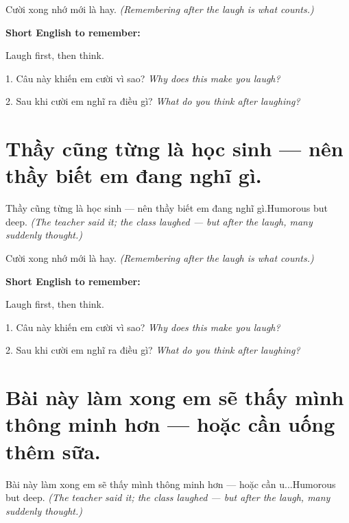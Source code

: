 \begin{baihoc}
Cười xong nhớ mới là hay.
\textit{(Remembering after the laugh is what counts.)}
\end{baihoc}

\begin{ghinhoanh}
\textbf{Short English to remember:}

Laugh first, then think.

\end{ghinhoanh}

\begin{tuhocnhanh}
1. Câu này khiến em cười vì sao? \textit{Why does this make you laugh?}

2. Sau khi cười em nghĩ ra điều gì? \textit{What do you think after laughing?}
\end{tuhocnhanh}
\ngancach


\section{Thầy cũng từng là học sinh — nên thầy biết em đang nghĩ gì.}
\begin{truyen}{Thầy cũng từng là học sinh — nên thầy biết em đang nghĩ gì.}{Humorous but deep.}
\textit{(The teacher said it; the class laughed — but after the laugh, many suddenly thought.)}
\end{truyen}

\begin{baihoc}
Cười xong nhớ mới là hay.
\textit{(Remembering after the laugh is what counts.)}
\end{baihoc}

\begin{ghinhoanh}
\textbf{Short English to remember:}

Laugh first, then think.

\end{ghinhoanh}

\begin{tuhocnhanh}
1. Câu này khiến em cười vì sao? \textit{Why does this make you laugh?}

2. Sau khi cười em nghĩ ra điều gì? \textit{What do you think after laughing?}
\end{tuhocnhanh}
\ngancach


\section{Bài này làm xong em sẽ thấy mình thông minh hơn — hoặc cần uống thêm sữa.}
\begin{truyen}{Bài này làm xong em sẽ thấy mình thông minh hơn — hoặc cần u...}{Humorous but deep.}
\textit{(The teacher said it; the class laughed — but after the laugh, many suddenly thought.)}
\end{truyen}

